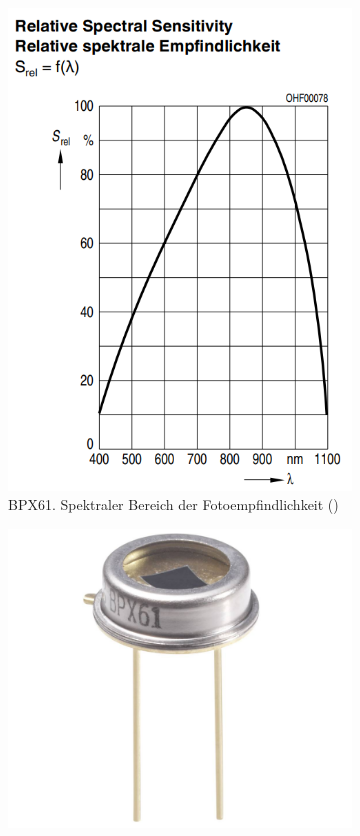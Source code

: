 \documentclass[12pt]{article}
\begin{document}
\begin{figure}[h!]
  \centering
  \begin{subfigure}[b]{0.45\linewidth}
    \includegraphics[width=\linewidth]{bpx61empfindlichkeit}
    \caption{BPX61. Spektraler Bereich der Fotoempfindlichkeit (\cite{OSRAM.2014}) }
  \end{subfigure}
  \begin{subfigure}[b]{0.45\linewidth}
    \includegraphics[width=\linewidth]{bpx61}

\end{subfigure}
\end{figure}
\end{document}
